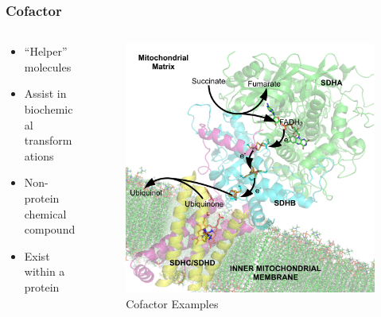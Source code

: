 \documentclass[10pt]{beamer}
\begin{document}
\begin{frame}
	\frametitle{Cofactor}

	\begin{columns}[T]
		\begin{column}{.5\textwidth}
			\begin{itemize}
				\item ``Helper'' molecules
				\item Assist in biochemical transformations
				\item Non-protein chemical compound
				\item Exist within a protein
			\end{itemize}
		\end{column}
		\begin{column}{.5\textwidth}
			\begin{figure}
				\caption{Cofactor Examples}
				\includegraphics[width=1.0\textwidth,natwidth=1630,natheight=1620]{img/Succinate_Dehydrogenase_1YQ3_Electron_Carriers_Labeled.png}
			\end{figure}
		\end{column}
	\end{columns}
	
\end{frame}
\end{document}
